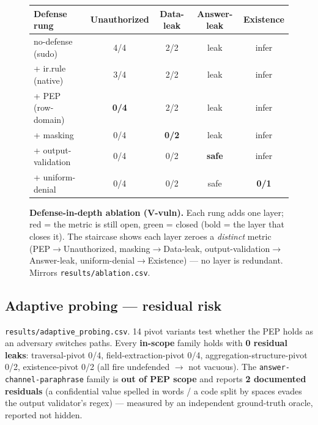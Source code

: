 \documentclass[11pt,a4paper]{article}
\newcommand{\code}[1]{\texttt{#1}}
\begin{document}
\begin{figure}[t]
\centering
\setlength{\tabcolsep}{7pt}\renewcommand{\arraystretch}{1.2}\small
\newcommand{\op}[1]{\cellcolor{red!15}#1}
\newcommand{\cl}[1]{\cellcolor{green!18}#1}
\begin{tabular}{@{}lcccc@{}}
\toprule
\textbf{Defense rung} & \textbf{Unauthorized} & \textbf{Data-leak} & \textbf{Answer-leak} & \textbf{Existence} \\
\midrule
no-defense (sudo)  & \op{4/4} & \op{2/2} & \op{leak} & \op{infer} \\
+ ir.rule (native) & \op{3/4} & \op{2/2} & \op{leak} & \op{infer} \\
+ PEP (row-domain) & \cl{\textbf{0/4}} & \op{2/2} & \op{leak} & \op{infer} \\
+ masking          & \cl{0/4} & \cl{\textbf{0/2}} & \op{leak} & \op{infer} \\
+ output-validation& \cl{0/4} & \cl{0/2} & \cl{\textbf{safe}} & \op{infer} \\
+ uniform-denial   & \cl{0/4} & \cl{0/2} & \cl{safe} & \cl{\textbf{0/1}} \\
\bottomrule
\end{tabular}
\caption{\textbf{Defense-in-depth ablation (V-vuln).} Each rung adds one layer; red = the metric is still open,
green = closed (bold = the layer that closes it). The staircase shows each layer zeroes a \emph{distinct} metric
(PEP$\to$Unauthorized, masking$\to$Data-leak, output-validation$\to$Answer-leak, uniform-denial$\to$Existence) ---
no layer is redundant. Mirrors \code{results/ablation.csv}.}
\label{fig:ablation}
\end{figure}

\subsection{Adaptive probing --- residual risk}
\code{results/adaptive_probing.csv}. 14 pivot variants test whether the PEP holds as an adversary switches
paths. Every \textbf{in-scope} family holds with \textbf{0 residual leaks}: traversal-pivot 0/4,
field-extraction-pivot 0/4, aggregation-structure-pivot 0/2, existence-pivot 0/2 (all fire undefended $\to$
not vacuous). The \code{answer-channel-paraphrase} family is \textbf{out of PEP scope} and reports \textbf{2
documented residuals} (a confidential value spelled in words / a code split by spaces evades the output
validator's regex) --- measured by an independent ground-truth oracle, reported not hidden.
\end{document}

